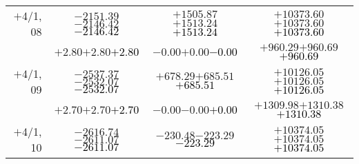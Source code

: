 \documentclass[compress]{beamer}
\begin{document}
\begin{frame}
{\begin{tabular}{r | c | c | c}
$+$4/1, 08 & $-2151.39$\hspace{0.1 cm}$-2146.42$\hspace{0.1 cm}\textcolor{black}{$-2146.42$} & $+1505.87$\hspace{0.1 cm}$+1513.24$\hspace{0.1 cm}\textcolor{black}{$+1513.24$} & $+10373.60$\hspace{0.1 cm}$+10373.60$\hspace{0.1 cm}\textcolor{black}{$+10373.60$} \\
           & $+2.80$\hspace{0.1 cm}$+2.80$\hspace{0.1 cm}\textcolor{black}{$+2.80$} & $-0.00$\hspace{0.1 cm}$+0.00$\hspace{0.1 cm}\textcolor{black}{$-0.00$} & $+960.29$\hspace{0.1 cm}$+960.69$\hspace{0.1 cm}\textcolor{black}{$+960.69$} \\
$+$4/1, 09 & $-2537.37$\hspace{0.1 cm}$-2532.07$\hspace{0.1 cm}\textcolor{black}{$-2532.07$} & $+678.29$\hspace{0.1 cm}$+685.51$\hspace{0.1 cm}\textcolor{black}{$+685.51$} & $+10126.05$\hspace{0.1 cm}$+10126.05$\hspace{0.1 cm}\textcolor{black}{$+10126.05$} \\
           & $+2.70$\hspace{0.1 cm}$+2.70$\hspace{0.1 cm}\textcolor{black}{$+2.70$} & $-0.00$\hspace{0.1 cm}$-0.00$\hspace{0.1 cm}\textcolor{black}{$+0.00$} & $+1309.98$\hspace{0.1 cm}$+1310.38$\hspace{0.1 cm}\textcolor{black}{$+1310.38$} \\
$+$4/1, 10 & $-2616.74$\hspace{0.1 cm}$-2611.07$\hspace{0.1 cm}\textcolor{black}{$-2611.07$} & $-230.48$\hspace{0.1 cm}$-223.29$\hspace{0.1 cm}\textcolor{black}{$-223.29$} & $+10374.05$\hspace{0.1 cm}$+10374.05$\hspace{0.1 cm}\textcolor{black}{$+10374.05$} \\

\end{tabular}}
\end{frame}
\end{document}
